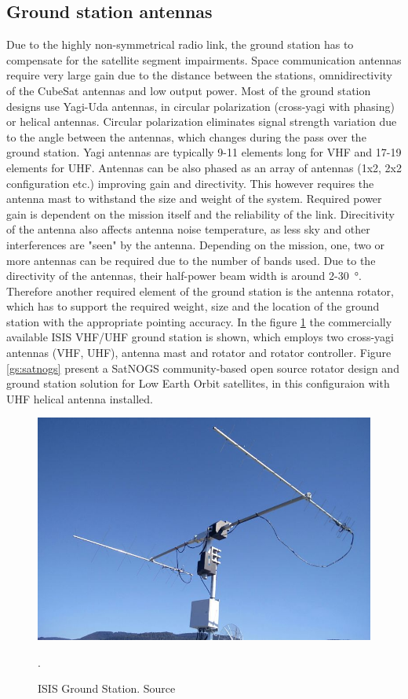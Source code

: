 \subsection{Ground station antennas}
Due to the highly non-symmetrical radio link, the ground station has to compensate for the satellite segment impairments. Space communication antennas require very large gain due to the distance between the stations, omnidirectivity of the CubeSat antennas and low output power. Most of the ground station designs use Yagi-Uda antennas, in circular polarization (cross-yagi with phasing) or helical antennas. Circular polarization eliminates signal strength variation due to the angle between the antennas, which changes during the pass over the ground station. Yagi antennas are typically 9-11 elements long for VHF and 17-19 elements for UHF. Antennas can be also phased as an array of antennas (1x2, 2x2 configuration etc.) improving gain and directivity. This however requires the antenna mast to withstand the size and weight of the system. Required power gain is dependent on the mission itself and the reliability of the link. Direcitivity of the antenna also affects antenna noise temperature, as less sky and other interferences are "seen" by the antenna. Depending on the mission, one, two or more antennas can be required due to the number of bands used. Due to the directivity of the antennas, their half-power beam  width is around \si{2}-\SI{30}{\degree}. Therefore another required element of the ground station is the antenna rotator, which has to support the required weight, size and the location of the ground station with the appropriate pointing accuracy.
In the figure \ref{isis_gs} the commercially available ISIS VHF/UHF ground station is shown, which employs two cross-yagi antennas (VHF, UHF), antenna mast and rotator and rotator controller. Figure \ref{gs:satnogs} present a SatNOGS \cite{satnogs} community-based open source rotator design and ground station solution for Low Earth Orbit satellites, in this configuraion with UHF helical antenna installed.

\begin{figure}[H]
    \centering
    \includegraphics[width=0.65\paperwidth]{img/4/isis_gs.jpg}
    \caption{ISIS Ground Station. Source \cite{isis_gs}}.
    \label{isis_gs}
\end{figure}

